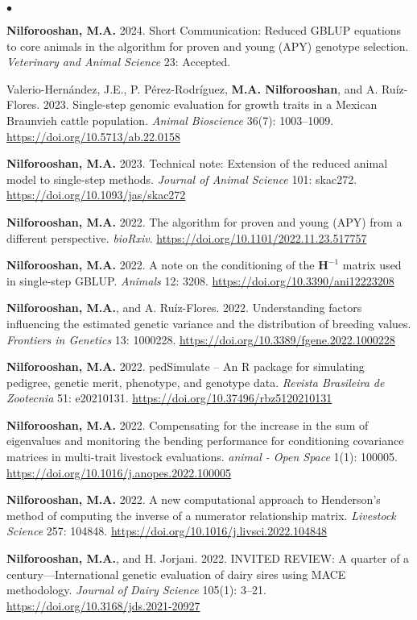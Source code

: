 \documentclass[margin,line]{res}
\newenvironment{list2}{
  \begin{list}{$\bullet$}{%
      \setlength{\itemsep}{0in}
      \setlength{\parsep}{0in} \setlength{\parskip}{0in}
      \setlength{\topsep}{0in} \setlength{\partopsep}{0in}
      \setlength{\leftmargin}{0.2in}}}{\end{list}}
\begin{document}
\begin{resume}
  \begin{list2}
    \item {\bf Nilforooshan, M.A.} 2024. Short Communication: Reduced GBLUP equations to core animals in the algorithm for proven and young (APY) genotype selection. {\em Veterinary and Animal Science} 23: Accepted.
    \item Valerio-Hern\'{a}ndez, J.E., P. P\'{e}rez-Rodr\'{i}guez, {\bf M.A. Nilforooshan}, and A. Ru\'{i}z-Flores. 2023. Single-step genomic evaluation for growth traits in a Mexican Braunvieh cattle population. {\em Animal Bioscience} 36(7): 1003--1009. \url{https://doi.org/10.5713/ab.22.0158}
    \item {\bf Nilforooshan, M.A.} 2023. Technical note: Extension of the reduced animal model to single-step methods. {\em Journal of Animal Science} 101: skac272. \url{https://doi.org/10.1093/jas/skac272}
    \item {\bf Nilforooshan, M.A.} 2022. The algorithm for proven and young (APY) from a different perspective. {\em bioRxiv}. \url{https://doi.org/10.1101/2022.11.23.517757}
    \item {\bf Nilforooshan, M.A.} 2022. A note on the conditioning of the $\mathbf H^{-1}$ matrix used in single-step GBLUP. {\em Animals} 12: 3208. \url{https://doi.org/10.3390/ani12223208}
    \item {\bf Nilforooshan, M.A.}, and A. Ru\'{i}z-Flores. 2022. Understanding factors influencing the estimated genetic variance and the distribution of breeding values. {\em Frontiers in Genetics} 13: 1000228. \url{https://doi.org/10.3389/fgene.2022.1000228}
    \item {\bf Nilforooshan, M.A.} 2022. pedSimulate -- An R package for simulating pedigree, genetic merit, phenotype, and genotype data. {\em Revista Brasileira de Zootecnia} 51: e20210131. \url{https://doi.org/10.37496/rbz5120210131}
    \item {\bf Nilforooshan, M.A.} 2022. Compensating for the increase in the sum of eigenvalues and monitoring the bending performance for conditioning covariance matrices in multi-trait livestock evaluations. {\em animal - Open Space} 1(1): 100005. \url{https://doi.org/10.1016/j.anopes.2022.100005}
    \item {\bf Nilforooshan, M.A.} 2022. A new computational approach to Henderson's method of computing the inverse of a numerator relationship matrix. {\em Livestock Science} 257: 104848. \url{https://doi.org/10.1016/j.livsci.2022.104848}
    \item {\bf Nilforooshan, M.A.}, and H. Jorjani. 2022. INVITED REVIEW: A quarter of a century---International genetic evaluation of dairy sires using MACE methodology. {\em Journal of Dairy Science} 105(1): 3--21. \url{https://doi.org/10.3168/jds.2021-20927}

\end{list2}
\end{resume}
\end{document}
